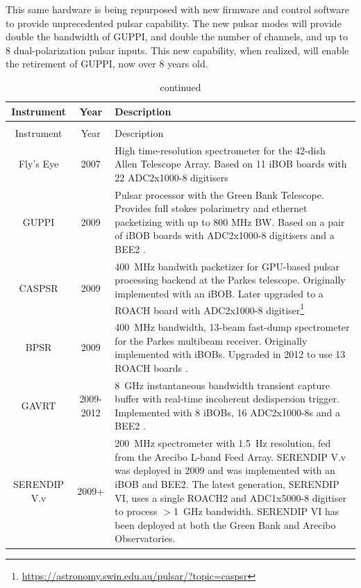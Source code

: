 \documentclass{ws-jai}
\begin{document}
This same hardware is being repurposed with new firmware and control
software to provide unprecedented pulsar capability.  The new pulsar
modes will provide double the bandwidth of GUPPI, and double the
number of channels, and up to 8 dual-polarization pulsar inputs.  This
new capability, when realized, will enable the retirement of GUPPI,
now over 8 years old.

\begin{longtable}{ccp{10cm}}
  \caption{Spectrometers and packetizers powered by CASPER hardware.}\\
  Instrument & Year & Description \\
  \hline \endfirsthead
  \caption[]{continued}\\
  Instrument & Year & Description \\
  \hline \endhead
  Fly's Eye        & 2007 & High time-resolution spectrometer for the 42-dish Allen Telescope Array. Based on 11 iBOB boards with 22 ADC2x1000-8 digitisers \citep{flyseye} \\
  GUPPI            & 2009 & Pulsar processor with the Green Bank Telescope. Provides full stokes polarimetry and ethernet packetizing with up to 800 MHz BW. Based on a pair of iBOB boards with ADC2x1000-8 digitisers and a BEE2 \citep{guppi}. \\
  CASPSR           & 2009 & 400~MHz bandwith packetizer for GPU-based pulsar processing backend at the Parkes telescope. Originally implemented with an iBOB. Later upgraded to a ROACH board with ADC2x1000-8 digitiser\footnote{\url{https://astronomy.swin.edu.au/pulsar/?topic=caspsr}} \\
  BPSR             & 2009 & 400~MHz bandwidth, 13-beam fast-dump spectrometer for the Parkes multibeam receiver. Originally implemented with iBOBs. Upgraded in 2012 to use 13 ROACH boards \citep{mcmahon-thesis, 2010MNRAS.409..619K}. \\
  GAVRT            & 2009-2012 & 8~GHz instantaneous bandwidth transient capture buffer with real-time incoherent dedispersion trigger. Implemented with 8 iBOBs, 16 ADC2x1000-8s and a BEE2 \citep{jon10, JonesDSS28}. \\
  SERENDIP V.v     & 2009+ & 200~MHz spectrometer with 1.5~Hz resolution, fed from the Arecibo L-band Feed Array. SERENDIP V.v was deployed in 2009 \citep{seti} and was implemented with an iBOB and BEE2. The latest generation, SERENDIP VI, uses a single ROACH2 and ADC1x5000-8 digitiser to process $>$1~GHz bandwidth. SERENDIP VI has been deployed at both the Green Bank and Arecibo Observatories. \\

\end{longtable}
\end{document}
